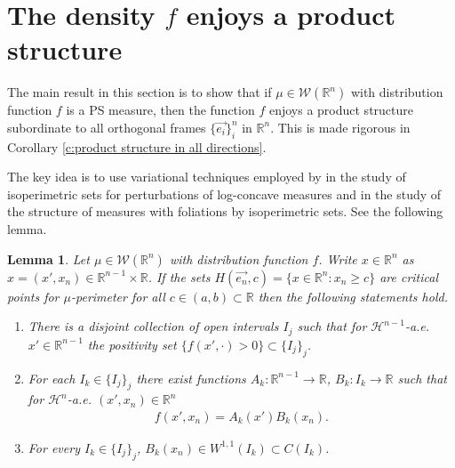 \documentclass[12pt]{amsart}
\numberwithin{equation}{section}
\theoremstyle{plain}
\newtheorem{lemma}[theorem]{Lemma}
\theoremstyle{definition}
\begin{document}
\section{The density $f$ enjoys a product structure}

The main result in this section is to show that if $\mu \in \mathscr{W}(\mathbb{R}^n)$ with distribution function $f$ is a PS measure, then the function $f$ enjoys a product structure subordinate to all orthogonal frames $\{\vec{e_i}\}_i^n$ in $\mathbb{R}^n$. This is made rigorous in Corollary \ref{c:product structure in all directions}.

The key idea is to use variational techniques employed by \cite{Rosales14} in the study of isoperimetric sets for perturbations of log-concave measures and \cite{BrockChiacchioMercaldo12}\cite{BrockChiacchio16} in the study of the structure of measures with foliations by isoperimetric sets. See the following lemma.

\begin{lemma}\label{l:product structure}
    Let $\mu \in \mathscr{W}(\mathbb{R}^n)$ with distribution function $f$. Write $x \in \mathbb{R}^n$ as $x = (x', x_n) \in \mathbb{R}^{n-1}\times \mathbb{R}$.  If the sets $H(\vec{e_n}, c) =\{x \in \mathbb{R}^n: x_n \ge c\}$ are \emph{critical points} for $\mu$-perimeter for all $c \in (a, b) \subset \mathbb{R}$ then the following statements hold.
    \begin{enumerate}
        \item There is a disjoint collection of open intervals $I_j$ such that for $\mathcal{H}^{n-1}$-a.e. $x' \in \mathbb{R}^{n-1}$ the positivity set $\{f(x', \cdot)>0\} \subset \{I_j\}_j$.
        \item For each $I_k \in \{I_j \}_j$ there exist functions $A_k: \mathbb{R}^{n-1}\rightarrow \mathbb{R}$, $B_k:I_k\rightarrow \mathbb{R}$ such that for $\mathcal{H}^{n}$-a.e. $(x', x_n) \in \mathbb{R}^{n}$
    \begin{align}\label{e: product structure x' x n}
        f(x',x_n) = A_k(x')B_k(x_n).
    \end{align}
    \item For every $I_k \in \{I_j \}_j$, $B_k(x_n) \in W^{1, 1}(I_k) \subset C(I_k)$.
    \end{enumerate}
    \end{lemma}
\end{document}
